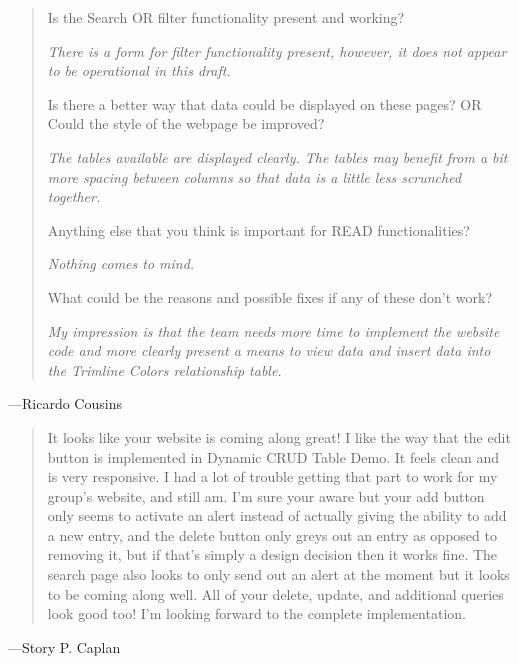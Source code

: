 \documentclass[11pt,letterpaper,oneside]{amsart}
\begin{document}
\begin{tcolorbox}
\begin{quotation}
Is the Search OR filter functionality present and working?

\emph{There is a form for filter functionality present, however, it does not appear to be operational in this draft.}

Is there a better way that data could be displayed on these pages? OR Could the style of the webpage be improved?

\emph{The tables available are displayed clearly. The tables may benefit from a bit more spacing between columns so that data is a little less scrunched together.}

Anything else that you think is important for READ functionalities?

\emph{Nothing comes to mind.}

What could be the reasons and possible fixes if any of these don't work?

\emph{My impression is that the team needs more time to implement the website code and more clearly present a means to view data and insert data into the Trimline Colors relationship table.}

\end{quotation} \end{tcolorbox}
---Ricardo Cousins



\begin{tcolorbox} \begin{quotation}

It looks like your website is coming along great! I like the way that the edit button is implemented in Dynamic CRUD Table Demo. It feels clean and is very responsive. I had a lot of trouble getting that part to work for my group's website, and still am. I'm sure your aware but your add button only seems to activate an alert instead of actually giving the ability to add a new entry, and the delete button only greys out an entry as opposed to removing it, but if that's simply a design decision then it works fine. The search page also looks to only send out an alert at the moment but it looks to be coming along well. All of your delete, update, and additional queries look good too! I'm looking forward to the complete implementation.

\end{quotation} \end{tcolorbox}

---Story P. Caplan
\end{document}
